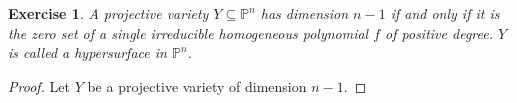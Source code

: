\documentclass[12pt,letterpaper]{article}
\newtheorem{problem}{Exercise}[section]
\theoremstyle{definition}
\theoremstyle{remark}
\numberwithin{equation}{section}
\numberwithin{figure}{problem}
\newcommand{\PP}{\mathbb{P}}
\begin{document}
\begin{problem} A projective variety $Y \subseteq \PP^n$ has dimension $n-1$ if and only if it is the zero set of a single irreducible homogeneous polynomial $f$ of positive degree. $Y$ is called a hypersurface in $\PP^n$. 
\end{problem}
\begin{proof}
  Let $Y$ be a projective variety of dimension $n-1$. 
\end{proof}

\printbibliography
\end{document}
